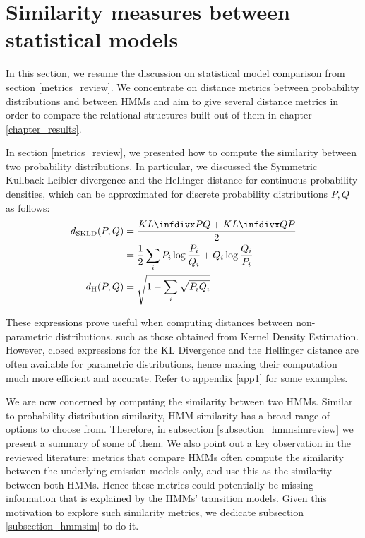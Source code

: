 \documentclass[../main.tex]{subfiles}
\begin{document}
\section{Similarity measures between statistical models} \label{section_similarity}
In this section, we resume the discussion on statistical model comparison from section \ref{metrics_review}. We concentrate on distance metrics between probability distributions and between HMMs and aim to give several distance metrics in order to compare the relational structures built out of them in chapter \ref{chapter_results}. 
\par In section \ref{metrics_review}, we presented how to compute the similarity between two probability distributions. In particular, we discussed the Symmetric Kullback-Leibler divergence and the Hellinger distance for continuous probability densities, which can be approximated for discrete probability distributions $P, Q$ as follows:
\begin{align*}
d_{\text{SKLD}}(P, Q) &= \frac{KL\infdiv{P}{Q} + KL\infdiv{Q}{P}}{2}\\ &= \frac{1}{2}\sum_iP_i\log{\frac{P_i}{Q_i}} + Q_i\log{\frac{Q_i}{P_i}}\\
d_{\text{H}}(P, Q) &= \sqrt{1 - \sum_i \sqrt{P_iQ_i}}
\end{align*}
\par These expressions prove useful when computing distances between non-parametric distributions, such as those obtained from Kernel Density Estimation. However, closed expressions for the KL Divergence and the Hellinger distance are often available for parametric distributions, hence making their computation much more efficient and accurate. Refer to appendix \ref{app1} for some examples.
\par We are now concerned by computing the similarity between two HMMs. Similar to probability distribution similarity, HMM similarity has a broad range of options to choose from. Therefore, in subsection \ref{subsection_hmmsimreview} we present a summary of some of them. We also point out a key observation in the reviewed literature: metrics that compare HMMs often compute the similarity between the underlying emission models only, and use this as the similarity between both HMMs. Hence these metrics could potentially be missing information that is explained by the HMMs' transition models. Given this motivation to explore such similarity metrics, we dedicate subsection \ref{subsection_hmmsim} to do it.
\end{document}
